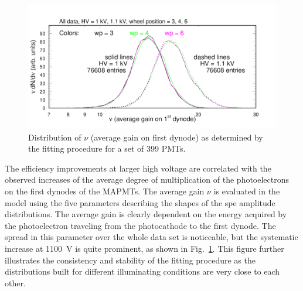 \begin{figure}[h!]
	\centering
	\includegraphics[width=0.98\linewidth, trim=0 12 50 35,clip]{figures/pglobal_nu.pdf}
	\caption{Distribution of $\nu$ (average gain on first dynode) as determined by the fitting procedure for a set of 399 PMTs.}
	\label{fig:pglobal_nu}
\end{figure}
The efficiency improvements at larger high voltage are correlated with the observed increases of the average degree of multiplication of the photoelectrons on the first dynodes of the MAPMTs. The average gain $\nu$ is evaluated in the model using the five parameters describing the shapes of the spe amplitude distributions. The average gain is clearly dependent on the energy acquired by the photoelectron traveling from the photocathode to the first dynode. The spread in this parameter over the whole data set is noticeable, but the systematic increase at 1100~V is quite prominent, as shown in Fig.~\ref{fig:pglobal_nu}. This figure further illustrates the consistency and stability of the fitting procedure as the distributions built for different illuminating conditions are very close to each other.

